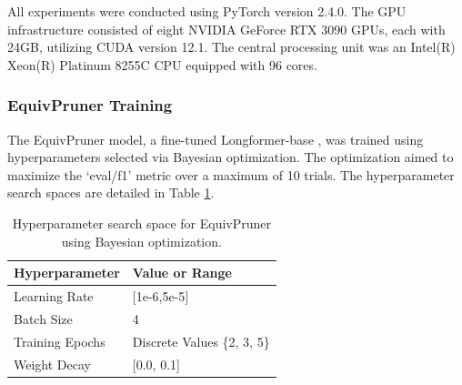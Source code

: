 \documentclass[11pt]{article}
\begin{document}
All experiments were conducted using PyTorch version 2.4.0. The GPU infrastructure consisted of eight NVIDIA GeForce RTX 3090 GPUs, each with 24GB, utilizing CUDA version 12.1. The central processing unit was an Intel(R) Xeon(R) Platinum 8255C CPU equipped with 96 cores.

\subsubsection{EquivPruner Training}
\label{subapp:EquivPruner_Training}

The EquivPruner model, a fine-tuned Longformer-base \citep{beltagy2020longformer}, was trained using hyperparameters selected via Bayesian optimization. The optimization aimed to maximize the `eval/f1' metric over a maximum of 10 trials. The hyperparameter search spaces are detailed in Table \ref{tab:equivpruner_hyperparams}.
\begin{table}[ht]
\centering
\caption{Hyperparameter search space for EquivPruner using Bayesian optimization.}
\label{tab:equivpruner_hyperparams}
\begin{tabular}{ll}
\hline
\textbf{Hyperparameter} & \textbf{Value or Range}  \\ \hline
Learning Rate           & {[}1e-6,5e-5{]}          \\
Batch Size              & 4                        \\
Training Epochs         & Discrete Values \{2, 3, 5\} \\
Weight Decay            & {[}0.0, 0.1{]}           \\ \hline
\end{tabular}
\end{table}
\end{document}

